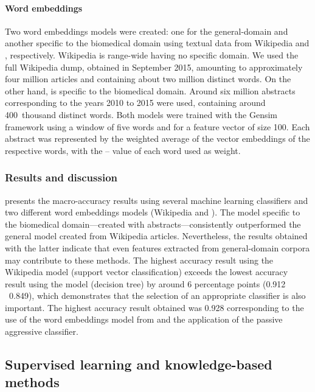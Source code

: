 \paragraph{Word embeddings}

Two word embeddings models were created: one for the general-domain and another specific to the biomedical domain using textual data from Wikipedia and , respectively.
Wikipedia is range-wide having no specific domain.
We used the full Wikipedia dump, obtained in September 2015, amounting to approximately four million articles and containing about two million distinct words.
On the other hand,  is specific to the biomedical domain.
Around six million abstracts corresponding to the years 2010 to 2015 were used, containing around 400~thousand distinct words.
Both models were trained with the Gensim framework \parencite{rehurek2010a} using a window of five words and for a feature vector of size 100.
Each abstract was represented by the weighted average of the vector embeddings of the respective words, with the -- value of each word used as weight.


\subsubsection{Results and discussion}

 presents the macro-accuracy results using several machine learning classifiers and two different word embeddings models (Wikipedia and ).
The model specific to the biomedical domain---created with  abstracts---consistently outperformed the general model created from Wikipedia articles.
Nevertheless, the results obtained with the latter indicate that even features extracted from general-domain corpora may contribute to these methods.
The highest accuracy result using the Wikipedia model (support vector classification) exceeds the lowest accuracy result using the  model (decision tree) by around 6 percentage points (0.912 \vs\ 0.849), which demonstrates that the selection of an appropriate classifier is also important.
The highest accuracy result obtained was 0.928 corresponding to the use of the word embeddings model from  and the application of the passive aggressive classifier.




\subsection{Supervised learning and knowledge-based methods}
\label{c3:ss:supervised-and-kb}

